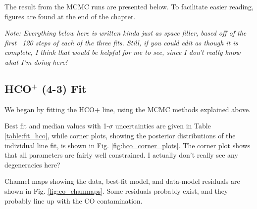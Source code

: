 The result from the MCMC runs are presented below. To facilitate easier reading, figures are found at the end of the chapter.

\textit{Note: Everything below here is written kinda just as space filler, based off of the first ~120 steps of each of the three fits. Still, if you could edit as though it is complete, I think that would be helpful for me to see, since I don't really know what I'm doing here!}



\subsection{HCO$^+$ (4-3) Fit}

We began by fitting the HCO+ line, using the MCMC methods explained above.

Best fit and median values with 1-$\sigma$  uncertainties are given in Table \ref{table:fit_hco}, while corner plots, showing the posterior distributions of the individual line fit, is shown in Fig. \ref{fig:hco_corner_plots}. The corner plot shows that all parameters are fairly well constrained. I actually don't really see any degeneracies here?


Channel maps showing the data, best-fit model, and data-model residuals are shown in Fig. \ref{fig:co_chanmaps}. Some residuals probably exist, and they probably line up with the CO contamination.


